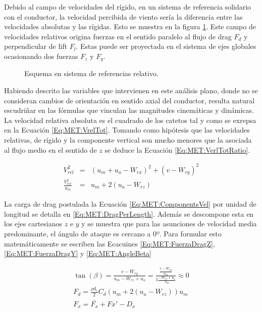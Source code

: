 Debido al campo de velocidades del rígido, en un sistema de referencia solidario con el conductor, la velocidad percibida de viento sería la diferencia entre las velocidades absolutas y las rígidas. Esto se muestra en la figura \ref{fig:MET:Viento:VelRel}. Este campo de velocidades relativos origina fuerzas en el sentido paralelo al flujo de drag $F_d$ y perpendicular de lift $F_l$. Estas puede ser proyectada en el sistema de ejes globales ocasionando dos fuerzas $F_z$ y $F_y$.


\begin{figure}[htbp]
	\centering
	\def\svgwidth{80mm}
	
	\caption{Esquema en sistema de referencias relativo.}
	\label{fig:MET:Viento:VelRel}
\end{figure}

Habiendo descrito las variables que intervienen en este análisis plano, donde no se consideran cambios de orientación en sentido axial del conductor, resulta natural escudriñar en las fórmulas que vinculan las magnitudes cinemáticas y dinámicas. La velocidad relativa absoluta es el cuadrado de los catetos tal y como se exrepsa en la Ecuación \eqref{Eq:MET:VrelTot}. Tomando como hipótesis que las velocidades relativas, de rígido y la componente vertical son mucho menores que la asociada al flujo medio en el sentido de $z$ se deduce la Ecuación \eqref{Eq:MET:VerlTotRatio}. 


\begin{eqnarray}
	\label{Eq:MET:VrelTot}
	V_{rel}^2&=&(u_m+u_a-W_{rx})^2+(v-W_{ry})^2\\
		\label{Eq:MET:VerlTotRatio}
	\frac{V_{rel}^2}{u_m}&=&u_m + 2 (u_a-W_{rz})
\end{eqnarray}

La carga de drag postulada la Ecuación \eqref{Eq:MET:ComponentsVel} por unidad de longitud se detalla en \eqref{Eq:MET:DragPerLength}.  Además se descompone esta en los ejes cartesianos $z$ e $y$ y se muestra que para las asunciones de velocidad media predominante, el ángulo de ataque es cercano a 0º. Para formular esto matemáticamente se escriben las Ecacuines  \eqref{Eq:MET:FuerzaDragZ}, \eqref{Eq:MET:FuerzaDragY} y \eqref{Eq:MET:AngleBeta}

\begin{eqnarray}
	\label{Eq:MET:AngleBeta}
	\tan (\beta) = \frac{v-W_{ry}}{u_m - W_{rz} + u_a}=\frac{\frac{v-W_{ry}}{u_m}}{1 \frac{- W_{rz} + u_a}{u_m}}\approx 0 \\
	 \label{Eq:MET:DragPerLength}
	F_d = \frac{\rho d_c}{2}C_d (u_m + 2 (u_a-W_{rz}))u_m\\
	\label{Eq:MET:FuerzaDragZ}
	F_x = \bar{F_x}+Fx'-D_x
\end{eqnarray}




